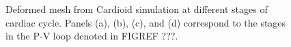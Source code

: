 \begin{figure}[ht!]
{\label{fig:snaps4}}		
%
\caption{Deformed mesh from Cardioid simulation at different stages of cardiac cycle. Panels (a), (b), (c), and (d) correspond to the stages in the P-V loop denoted in FIGREF ???.}
\label{fig:snaps}
\end{figure}

\begin{figure}[ht]
\centering
{}		
\end{figure}
